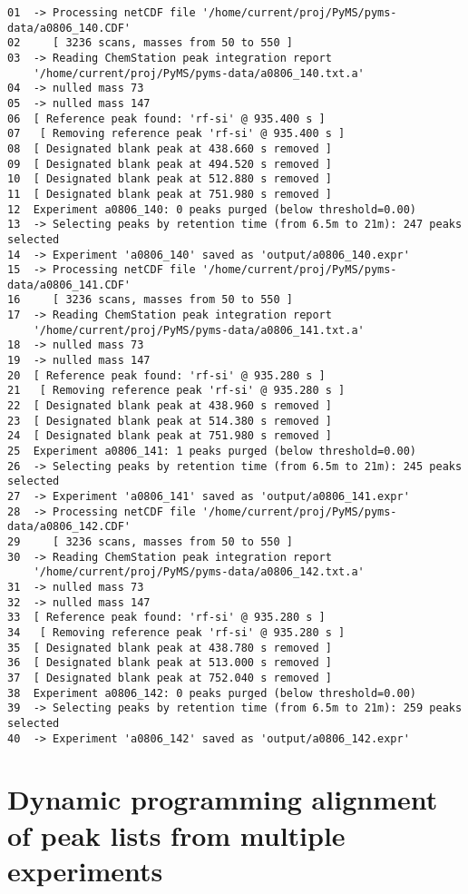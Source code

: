 \begin{verbatim}
01  -> Processing netCDF file '/home/current/proj/PyMS/pyms-data/a0806_140.CDF'
02     [ 3236 scans, masses from 50 to 550 ]
03  -> Reading ChemStation peak integration report
    '/home/current/proj/PyMS/pyms-data/a0806_140.txt.a'
04  -> nulled mass 73
05  -> nulled mass 147
06  [ Reference peak found: 'rf-si' @ 935.400 s ]
07   [ Removing reference peak 'rf-si' @ 935.400 s ]
08 	[ Designated blank peak at 438.660 s removed ]
09 	[ Designated blank peak at 494.520 s removed ]
10 	[ Designated blank peak at 512.880 s removed ]
11 	[ Designated blank peak at 751.980 s removed ]
12  Experiment a0806_140: 0 peaks purged (below threshold=0.00)
13  -> Selecting peaks by retention time (from 6.5m to 21m): 247 peaks selected
14  -> Experiment 'a0806_140' saved as 'output/a0806_140.expr'
15  -> Processing netCDF file '/home/current/proj/PyMS/pyms-data/a0806_141.CDF'
16     [ 3236 scans, masses from 50 to 550 ]
17  -> Reading ChemStation peak integration report
    '/home/current/proj/PyMS/pyms-data/a0806_141.txt.a'
18  -> nulled mass 73
19  -> nulled mass 147
20  [ Reference peak found: 'rf-si' @ 935.280 s ]
21   [ Removing reference peak 'rf-si' @ 935.280 s ]
22 	[ Designated blank peak at 438.960 s removed ]
23 	[ Designated blank peak at 514.380 s removed ]
24 	[ Designated blank peak at 751.980 s removed ]
25  Experiment a0806_141: 1 peaks purged (below threshold=0.00)
26  -> Selecting peaks by retention time (from 6.5m to 21m): 245 peaks selected
27  -> Experiment 'a0806_141' saved as 'output/a0806_141.expr'
28  -> Processing netCDF file '/home/current/proj/PyMS/pyms-data/a0806_142.CDF'
29     [ 3236 scans, masses from 50 to 550 ]
30  -> Reading ChemStation peak integration report
    '/home/current/proj/PyMS/pyms-data/a0806_142.txt.a'
31  -> nulled mass 73
32  -> nulled mass 147
33  [ Reference peak found: 'rf-si' @ 935.280 s ]
34   [ Removing reference peak 'rf-si' @ 935.280 s ]
35 	[ Designated blank peak at 438.780 s removed ]
36 	[ Designated blank peak at 513.000 s removed ]
37 	[ Designated blank peak at 752.040 s removed ]
38  Experiment a0806_142: 0 peaks purged (below threshold=0.00)
39  -> Selecting peaks by retention time (from 6.5m to 21m): 259 peaks selected
40  -> Experiment 'a0806_142' saved as 'output/a0806_142.expr'
\end{verbatim}

\section{Dynamic programming alignment of peak lists from multiple experiments}

